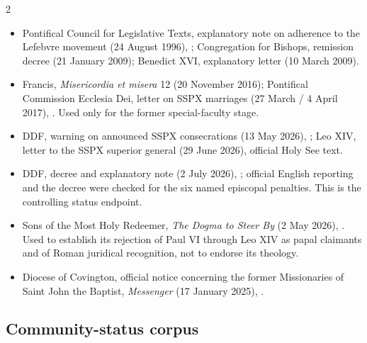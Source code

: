 \begin{multicols}{2}
\begin{itemize}[itemsep=0.12em,topsep=0.15em]
\item Pontifical Council for Legislative Texts, explanatory note on adherence to the Lefebvre movement (24 August 1996), ; Congregation for Bishops, remission decree (21 January 2009); Benedict XVI, explanatory letter (10 March 2009).
\item Francis, \emph{Misericordia et misera} 12 (20 November 2016); Pontifical Commission Ecclesia Dei, letter on SSPX marriages (27 March / 4 April 2017), . Used only for the former special-faculty stage.
\item DDF, warning on announced SSPX consecrations (13 May 2026), ; Leo XIV, letter to the SSPX superior general (29 June 2026), official Holy See text.
\item DDF, decree and explanatory note (2 July 2026), ; official English reporting and the decree were checked for the six named episcopal penalties. This is the controlling status endpoint.
\item Sons of the Most Holy Redeemer, \emph{The Dogma to Steer By} (2 May 2026), . Used to establish its rejection of Paul VI through Leo XIV as papal claimants and of Roman juridical recognition, not to endorse its theology.
\item Diocese of Covington, official notice concerning the former Missionaries of Saint John the Baptist, \emph{Messenger} (17 January 2025), .
\end{itemize}

\subsection*{Community-status corpus}


\end{multicols}
